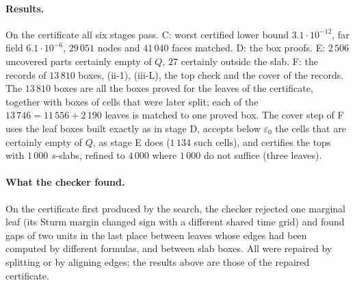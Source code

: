 \documentclass[11pt]{article}
\theoremstyle{definition}
\begin{document}
\paragraph{Results.} On the certificate all six stages pass. C: worst certified
lower bound $3.1\cdot10^{-12}$, far field $6.1\cdot10^{-6}$, $29\,051$ nodes and $41\,040$ faces matched. D: the box
proofs. E: $2\,506$ uncovered parts certainly empty of $Q$, $27$ certainly outside
the slab. F: the records of $13\,810$ boxes, (ii-1), (iii-L), the top check and the cover of the records. The
$13\,810$ boxes are all the boxes proved for the leaves of the certificate, together with boxes of cells that were
later split; each of the $13\,746=11\,556+2\,190$ leaves is matched to one proved box. The cover step of F uses the leaf
boxes built exactly as in stage D, accepts below $\varepsilon_0$ the cells that are certainly empty of $Q$, as stage E
does ($1\,134$ such cells), and certifies the tops with $1\,000$ $s$-slabs, refined to $4\,000$ where $1\,000$ do not
suffice (three leaves).

\paragraph{What the checker found.} On the certificate first produced by the search, the checker rejected one marginal
leaf (its Sturm margin changed sign with a different shared time grid) and found gaps of two units in the last place
between leaves whose edges had been computed by different formulas, and between slab boxes. All were repaired by
splitting or by aligning edges; the results above are those of the repaired certificate.
\end{document}
